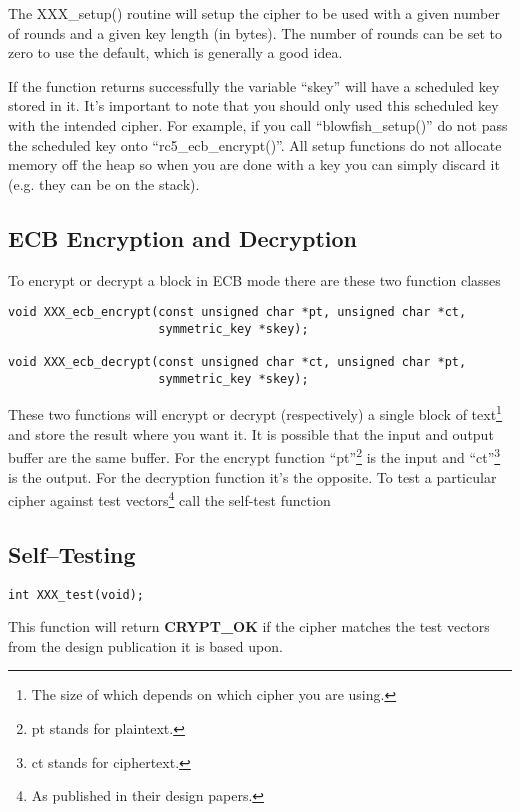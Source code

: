 \documentclass[a4paper]{book}
\begin{document}
The XXX\_setup() routine will setup the cipher to be used with a given number of rounds and a given key length (in bytes).
The number of rounds can be set to zero to use the default, which is generally a good idea.

If the function returns successfully the variable ``skey'' will have a scheduled key stored in it.  It's important to note
that you should only used this scheduled key with the intended cipher.  For example, if you call ``blowfish\_setup()'' do not 
pass the scheduled key onto ``rc5\_ecb\_encrypt()''.  All setup functions do not allocate memory off the heap so when you are 
done with a key you can simply discard it (e.g. they can be on the stack).

\subsection{ECB Encryption and Decryption}
To encrypt or decrypt a block in ECB mode there are these two function classes
 
\begin{verbatim}
void XXX_ecb_encrypt(const unsigned char *pt, unsigned char *ct,
                     symmetric_key *skey);

void XXX_ecb_decrypt(const unsigned char *ct, unsigned char *pt,
                     symmetric_key *skey);
\end{verbatim}
These two functions will encrypt or decrypt (respectively) a single block of text\footnote{The size of which depends on
which cipher you are using.} and store the result where you want it.  It is possible that the input and output buffer are 
the same buffer.  For the encrypt function ``pt''\footnote{pt stands for plaintext.} is the input and 
``ct''\footnote{ct stands for ciphertext.} is the output.  For the decryption function it's the opposite.  To test a particular 
cipher against test vectors\footnote{As published in their design papers.} call the self-test function
 
\subsection{Self--Testing}
\begin{verbatim}
int XXX_test(void);
\end{verbatim}
This function will return {\bf CRYPT\_OK} if the cipher matches the test vectors from the design publication it is 
based upon.  
\end{document}

